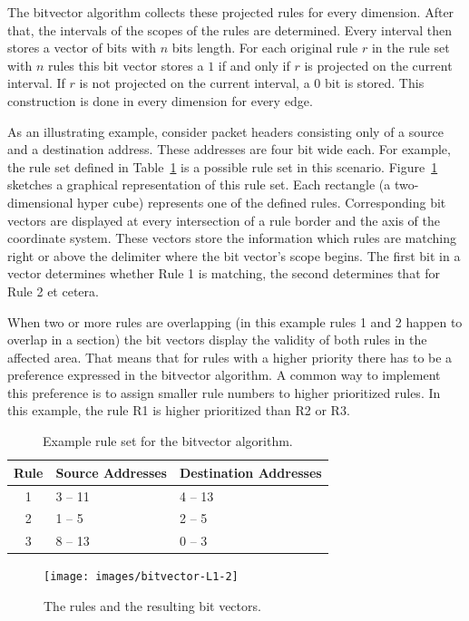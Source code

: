 \documentclass[a4paper,
		12pt,
		parskip=full,
		titlepage
		]{scrartcl}
\begin{document}
The bitvector algorithm collects these projected rules for every dimension.
After that, the intervals of the scopes of the rules are determined.
Every interval then stores a vector of bits with $n$ bits length.
For each original rule $r$ in the rule set with $n$ rules this bit vector 
stores a $1$ if and only if $r$ is projected on the current interval.
If $r$ is not projected on the current interval, a $0$ bit is stored.
This construction is done in every dimension for every edge.

As an illustrating example, consider packet headers consisting only of a source and a destination address.
These addresses are four bit wide each.
For example, the rule set defined in Table~\ref{table:bv_ruleset} is a possible rule set in this scenario.
Figure~\ref{fig:bv-normal} sketches a graphical representation of this rule set.
Each rectangle (a two-dimensional hyper cube) represents one of the defined rules.
Corresponding bit vectors are displayed at every intersection of a rule border and the axis of the coordinate system.
These vectors store the information which rules are matching right or above the delimiter where the bit vector's scope begins.
The first bit in a vector determines whether Rule 1 is matching, the second determines that for Rule 2 et cetera.

When two or more rules are overlapping (in this example rules 1 and 2 happen 
to overlap in a section) the bit vectors display the validity of both rules in the affected area.
That means that for rules with a higher priority there has to be a preference expressed in the bitvector algorithm.
A common way to implement this preference is to assign smaller rule numbers to higher prioritized rules.
In this example, the rule R1 is higher prioritized than R2 or R3.

\begin{table}
  \centering
  \begin{tabularx}{0.7\textwidth}{c|X|X}
  Rule&Source Addresses&Destination Addresses\\
  \hline
  1&3 -- 11&4 -- 13\\
  2&1 -- 5&2 -- 5\\
  3&8 -- 13&0 -- 3\\
  \end{tabularx}
  \caption{Example rule set for the bitvector algorithm.}
  \label{table:bv_ruleset}
\end{table}

\begin{figure}
\centering
\texttt{[image: images/bitvector-L1-2]}
\caption{The rules and the resulting bit vectors.}
\label{fig:bv-normal}
\end{figure}
\end{document}
